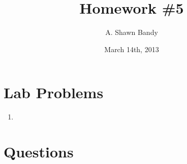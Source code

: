 \documentclass{article}
\begin{document}
\title{Homework \#5}
\author{A. Shawn Bandy}
\date{March 14th, 2013}
\maketitle
	\section{Lab Problems}
		\begin{enumerate}[L1]
			\item 
			
		\end{enumerate}
\begingroup
	\section{Questions}\hfill\\
		\let\clearpage\relax
		\begin{enumerate}[Q1]
			
			
			
		\end{enumerate}
\endgroup
\end{document}
